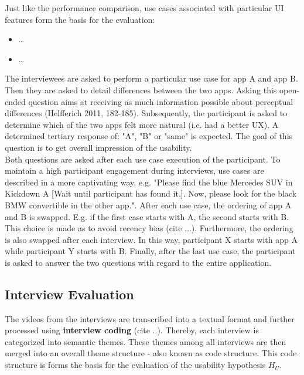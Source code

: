Just like the performance comparison, use cases associated with particular UI features form the basis for the evaluation: 
\begin{itemize}
    \item \dots
    \item \dots
\end{itemize}
The interviewees are asked to perform a particular use case for app A and app B. Then they are asked to detail differences between the two apps.
Asking this open-ended question aims at receiving as much information possible about perceptual differences (Helfferich 2011, 182-185).
Subsequently, the participant is asked to determine which of the two apps felt more natural (i.e. had a better UX). A determined tertiary response of: "A", "B" or "same" is expected. 
The goal of this question is to get overall impression of the usability. \\
Both questions are asked after each use case execution of the participant. 
To maintain a high participant engagement during interviews, use cases are described in a more captivating way, e.g. "Please find the blue Mercedes SUV in Kickdown A [Wait until participant has found it.]. Now, 
please look for the black BMW convertible in the other app.". 
After each use case, the ordering of app A and B is swapped. E.g. if the first case starts with A, the second starts with B. This choice is made as to avoid recency bias (cite ...).
Furthermore, the ordering is also swapped after each interview. In this way, participant X starts with app A while participant Y starts with B.
Finally, after the last use case, the participant is asked to answer the two questions with regard to the entire application.


\subsection{Interview Evaluation}
The videos from the interviews are transcribed into a textual format and further processed using \textbf{interview coding} (cite ..). Thereby, each interview is categorized into semantic themes. These themes among
all interviews are then merged into an overall theme structure - also known as code structure. This code structure is forms the basis for the evaluation of the usability hypothesis $H_U$. 
